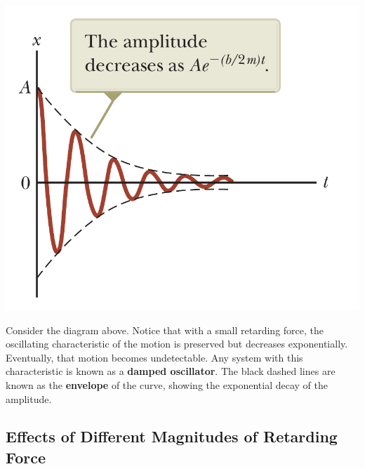 \begin{center}
    \includegraphics[scale=0.3]{images/oaw/damped01}
\end{center}

Consider the diagram above. Notice that with a small retarding force, the oscillating characteristic
of the motion is preserved but decreases exponentially. Eventually, that motion becomes undetectable.
Any system with this characteristic is known as a \textbf{damped oscillator}. The black dashed lines
are known as the \textbf{envelope} of the curve, showing the exponential decay of the amplitude.

\subsection{Effects of Different Magnitudes of Retarding Force}


